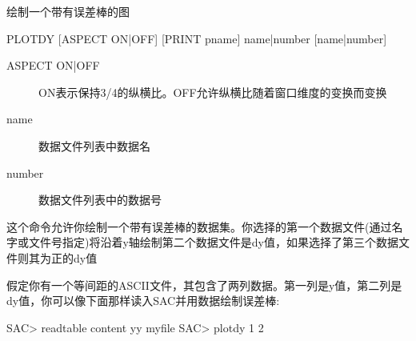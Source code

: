 \label{cmd:plotdy}

绘制一个带有误差棒的图

\begin{SACSTX}
PLOTDY [ASPECT ON|OFF] [PRINT pname] name|number [name|number]
\end{SACSTX}

\begin{description}
\item [ASPECT ON|OFF] ON表示保持3/4的纵横比。OFF允许纵横比随着窗口维度的变换而变换
\item [name] 数据文件列表中数据名
\item [number] 数据文件列表中的数据号
\end{description}

这个命令允许你绘制一个带有误差棒的数据集。你选择的第一个数据文件(通过名字或文件号指定)将沿着y轴绘制第二个数据文件是dy值，如果选择了第三个数据文件则其为正的dy值

假定你有一个等间距的ASCII文件，其包含了两列数据。第一列是y值，第二列是dy值，你可以像下面那样读入SAC并用数据绘制误差棒:
\begin{SACCode}
SAC> readtable content yy myfile
SAC> plotdy 1 2
\end{SACCode}
